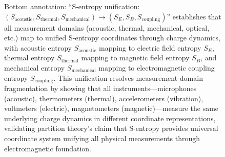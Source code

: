 \begin{figure}[htbp]
{Bottom annotation: ``S-entropy unification: $(S_{\text{acoustic}}, S_{\text{thermal}}, S_{\text{mechanical}}) \rightarrow (S_E, S_B, S_{\text{coupling}})$'' establishes that all measurement domains (acoustic, thermal, mechanical, optical, etc.) map to unified S-entropy coordinates through charge dynamics, with acoustic entropy $S_{\text{acoustic}}$ mapping to electric field entropy $S_E$, thermal entropy $S_{\text{thermal}}$ mapping to magnetic field entropy $S_B$, and mechanical entropy $S_{\text{mechanical}}$ mapping to electromagnetic coupling entropy $S_{\text{coupling}}$. This unification resolves measurement domain fragmentation by showing that all instruments—microphones (acoustic), thermometers (thermal), accelerometers (vibration), voltmeters (electric), magnetometers (magnetic)—measure the same underlying charge dynamics in different coordinate representations, validating partition theory's claim that S-entropy provides universal coordinate system unifying all physical measurements through electromagnetic foundation.}
\label{fig:unified_em_view}
\end{figure}



